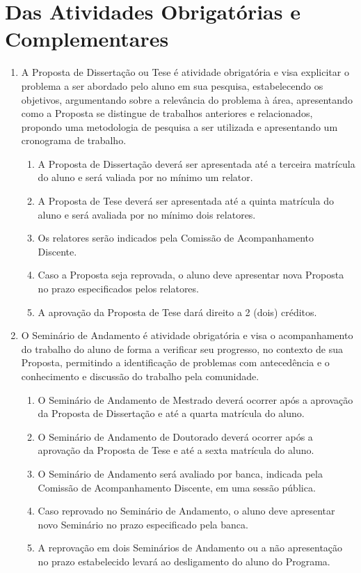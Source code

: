 \documentclass{article}
\begin{document}
\section{Das Atividades Obrigatórias e Complementares}
\begin{enumerate}

	\item  A Proposta de Dissertação ou Tese é atividade obrigatória e visa explicitar o problema a ser abordado pelo aluno em sua pesquisa, estabelecendo os objetivos, argumentando sobre a relevância do problema à área, apresentando como a Proposta se distingue de trabalhos anteriores e relacionados, propondo uma metodologia de pesquisa a ser utilizada e apresentando um cronograma de trabalho.
	\begin{enumerate}
		\item A Proposta de Dissertação deverá ser apresentada até a terceira matrícula do aluno e será valiada por no mínimo um relator.
		\item A Proposta de Tese deverá ser apresentada até a quinta matrícula do aluno e será avaliada por no mínimo dois relatores.
		\item Os relatores serão indicados pela Comissão de Acompanhamento Discente.
		\item Caso a Proposta seja reprovada, o aluno deve apresentar nova Proposta no prazo especificados pelos relatores.
		\item A aprovação da Proposta de Tese dará direito a 2 (dois) créditos.
	\end{enumerate}

	\item O Seminário de Andamento é atividade obrigatória e visa o acompanhamento do trabalho do aluno de forma a verificar seu progresso, no contexto de sua Proposta, permitindo a identificação de problemas com antecedência e o conhecimento e discussão do trabalho pela comunidade.
	\begin{enumerate}
		\item O Seminário de Andamento de Mestrado deverá ocorrer após a aprovação da Proposta de Dissertação e até a quarta matrícula do aluno.
		\item O Seminário de Andamento de Doutorado deverá ocorrer após a aprovação da Proposta de Tese e até a sexta matrícula do aluno.
		\item O Seminário de Andamento será avaliado por banca, indicada pela Comissão de Acompanhamento Discente, em uma sessão pública.
		\item Caso reprovado no Seminário de Andamento, o aluno deve apresentar novo Seminário no prazo especificado pela banca.
		\item A reprovação em dois Seminários de Andamento ou a não apresentação no prazo estabelecido levará ao desligamento do aluno do Programa.
	\end{enumerate}


\end{enumerate}
\end{document}

